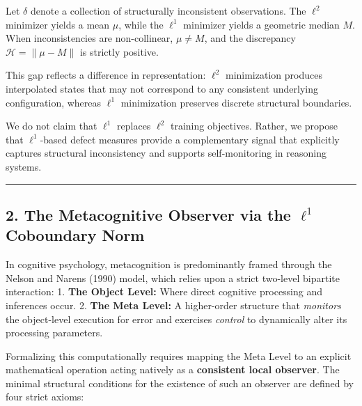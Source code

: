 \documentclass[
]{article}
\begin{document}
Let \(\delta\) denote a collection of structurally inconsistent
observations. The \(\ell^2\) minimizer yields a mean \(\mu\), while the
\(\ell^1\) minimizer yields a geometric median \(M\). When
inconsistencies are non-collinear, \(\mu \neq M\), and the discrepancy
\(\mathcal{H} = \|\mu - M\|\) is strictly positive.

This gap reflects a difference in representation: \(\ell^2\)
minimization produces interpolated states that may not correspond to any
consistent underlying configuration, whereas \(\ell^1\) minimization
preserves discrete structural boundaries.

We do not claim that \(\ell^1\) replaces \(\ell^2\) training objectives.
Rather, we propose that \(\ell^1\)-based defect measures provide a
complementary signal that explicitly captures structural inconsistency
and supports self-monitoring in reasoning systems.

\begin{center}\rule{0.5\linewidth}{0.5pt}\end{center}

\subsection{\texorpdfstring{2. The Metacognitive Observer via the
\(\ell^1\) Coboundary
Norm}{2. The Metacognitive Observer via the \textbackslash ell\^{}1 Coboundary Norm}}\label{the-metacognitive-observer-via-the-ell1-coboundary-norm}

In cognitive psychology, metacognition is predominantly framed through
the Nelson and Narens (1990) model, which relies upon a strict two-level
bipartite interaction: 1. \textbf{The Object Level:} Where direct
cognitive processing and inferences occur. 2. \textbf{The Meta Level:} A
higher-order structure that \emph{monitors} the object-level execution
for error and exercises \emph{control} to dynamically alter its
processing parameters.

Formalizing this computationally requires mapping the Meta Level to an
explicit mathematical operation acting natively as a \textbf{consistent
local observer}. The minimal structural conditions for the existence of
such an observer are defined by four strict axioms:
\end{document}
